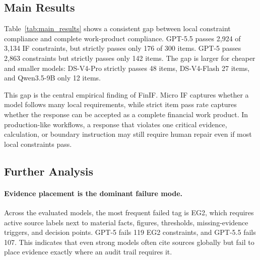 \subsection{Main Results}

\begin{table}[t]
\centering
\small
{}
\caption{Main results on FinIF-Test. IF metrics are percentages. Quality is a 0--10 auxiliary judge score. Strict pass requires satisfying every IF constraint in an item.}
\label{tab:main_results}
\end{table}

Table~\ref{tab:main_results} shows a consistent gap between local constraint compliance and complete work-product compliance.
GPT-5.5 passes 2,924 of 3,134 IF constraints, but strictly passes only 176 of 300 items.
GPT-5 passes 2,863 constraints but strictly passes only 142 items.
The gap is larger for cheaper and smaller models: DS-V4-Pro strictly passes 48 items, DS-V4-Flash 27 items, and Qwen3.5-9B only 12 items.

This gap is the central empirical finding of FinIF.
Micro IF captures whether a model follows many local requirements, while strict item pass rate captures whether the response can be accepted as a complete financial work product.
In production-like workflows, a response that violates one critical evidence, calculation, or boundary instruction may still require human repair even if most local constraints pass.

\subsection{Further Analysis}

\paragraph{Evidence placement is the dominant failure mode.}
Across the evaluated models, the most frequent failed tag is EG2, which requires active source labels next to material facts, figures, thresholds, missing-evidence triggers, and decision points.
GPT-5 fails 119 EG2 constraints, and GPT-5.5 fails 107.
This indicates that even strong models often cite sources globally but fail to place evidence exactly where an audit trail requires it.

